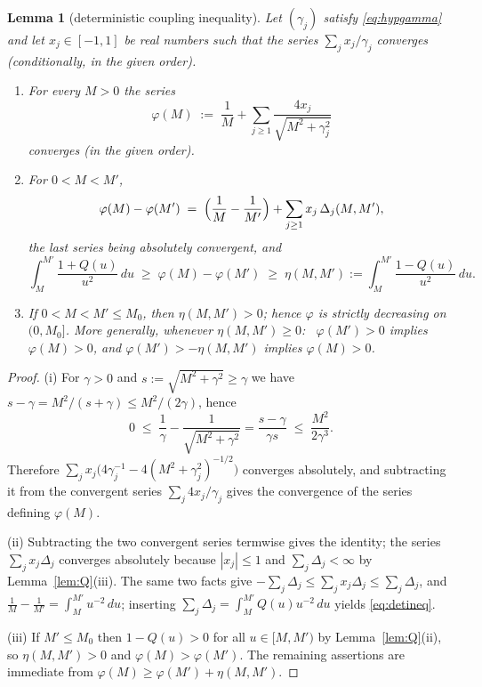 \documentclass[11pt]{amsart}
\newtheorem{lemma}[theorem]{Lemma}
\theoremstyle{definition}
\numberwithin{equation}{section}
\begin{document}
\begin{lemma}[deterministic coupling inequality]\label{lem:det}
Let $(\gamma_j)$ satisfy \eqref{eq:hypgamma} and let
$x_j\in[-1,1]$ be real numbers such that the series
$\sum_jx_j/\gamma_j$ converges (conditionally, in the given order).
\begin{enumerate}
\item[(i)] For every $M>0$ the series
\[
\varphi(M)\;:=\;\frac1M+\sum_{j\ge1}\frac{4x_j}{\sqrt{M^2+\gamma_j^2}}
\]
converges (in the given order).
\item[(ii)] For $0<M<M'$,
\[
\varphi(M)-\varphi(M')\;=\;\Bigl(\frac1M-\frac1{M'}\Bigr)
+\sum_{j\ge1}x_j\,\Delta_j(M,M'),
\]
the last series being absolutely convergent, and
\begin{equation}\label{eq:detineq}
\int_M^{M'}\frac{1+Q(u)}{u^2}\,du\;\ge\;
\varphi(M)-\varphi(M')\;\ge\;
\eta(M,M'):=\int_M^{M'}\frac{1-Q(u)}{u^2}\,du .
\end{equation}
\item[(iii)] If $0<M<M'\le M_0$, then $\eta(M,M')>0$; hence $\varphi$
is strictly decreasing on $(0,M_0]$. More generally, whenever
$\eta(M,M')\ge0$: \ $\varphi(M')>0$ implies $\varphi(M)>0$, and
$\varphi(M')>-\eta(M,M')$ implies $\varphi(M)>0$.
\end{enumerate}
\end{lemma}

\begin{proof}
(i) For $\gamma>0$ and $s:=\sqrt{M^2+\gamma^2}\ge\gamma$ we have
$s-\gamma=M^2/(s+\gamma)\le M^2/(2\gamma)$, hence
\begin{equation}\label{eq:gapbound}
0\;\le\;\frac1\gamma-\frac1{\sqrt{M^2+\gamma^2}}
=\frac{s-\gamma}{\gamma s}\;\le\;\frac{M^2}{2\gamma^3}.
\end{equation}
Therefore $\sum_jx_j\bigl(4\gamma_j^{-1}-4(M^2+\gamma_j^2)^{-1/2}\bigr)$
converges absolutely, and subtracting it from the convergent series
$\sum_j4x_j/\gamma_j$ gives the convergence of the series defining
$\varphi(M)$.

(ii) Subtracting the two convergent series termwise gives the
identity; the series $\sum_jx_j\Delta_j$ converges absolutely because
$|x_j|\le1$ and $\sum_j\Delta_j<\infty$ by Lemma~\ref{lem:Q}(iii). The
same two facts give
$-\sum_j\Delta_j\le\sum_jx_j\Delta_j\le\sum_j\Delta_j$, and
$\frac1M-\frac1{M'}=\int_M^{M'}u^{-2}\,du$; inserting
$\sum_j\Delta_j=\int_M^{M'}Q(u)u^{-2}\,du$ yields \eqref{eq:detineq}.

(iii) If $M'\le M_0$ then $1-Q(u)>0$ for all $u\in[M,M')$ by
Lemma~\ref{lem:Q}(ii), so $\eta(M,M')>0$ and
$\varphi(M)>\varphi(M')$. The remaining assertions are immediate from
$\varphi(M)\ge\varphi(M')+\eta(M,M')$.
\end{proof}
\end{document}
